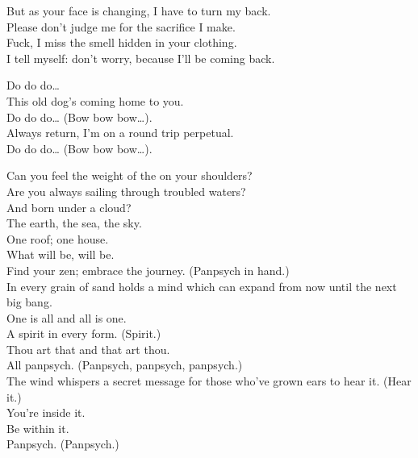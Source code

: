 
But as your face is changing, I have to turn my back. \\
Please don't judge me for the sacrifice I make. \\
Fuck, I miss the smell hidden in your clothing. \\
I tell myself: don't worry, because I'll be coming back. \\


Do do do… \\
This old dog's coming home to you. \\
Do do do… (Bow bow bow…). \\
Always return, I'm on a round trip perpetual. \\
Do do do… (Bow bow bow…). \\





Can you feel the weight of the  on your shoulders? \\
Are you always sailing through troubled waters? \\
And born under a cloud? \\
The earth, the sea, the sky. \\
One roof; one house. \\

What will be, will be. \\
Find your zen; embrace the journey. (Panpsych in hand.) \\
In every grain of sand holds a mind which can expand from now until the next big bang. \\

One is all and all is one. \\
A spirit in every form. (Spirit.) \\
Thou art that and that art thou. \\
All panpsych. (Panpsych, panpsych, panpsych.) \\
The wind whispers a secret message for those who've grown ears to hear it. (Hear it.) \\
You're inside it. \\
Be within it. \\
Panpsych. (Panpsych.) \\

